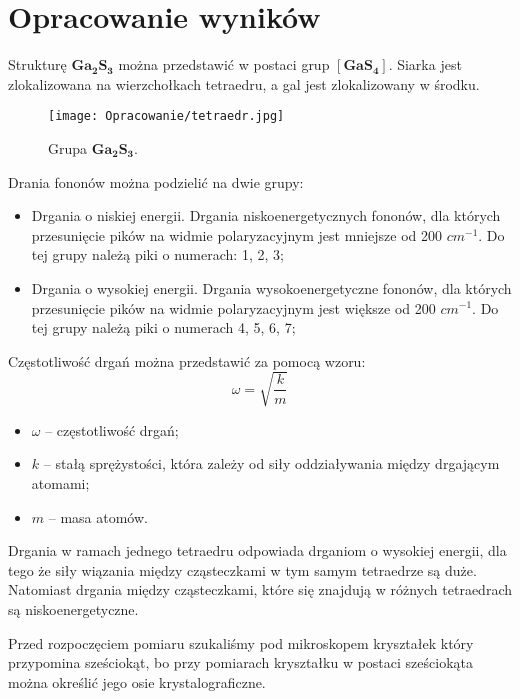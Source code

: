 \newpage

\section{Opracowanie wyników}

Strukturę $\mathbf{Ga_{2}S_{3}}$ można przedstawić w postaci grup $\mathbf{[GaS_{4}]}$. Siarka jest zlokalizowana na wierzchołkach tetraedru, a gal jest zlokalizowany w środku.

\begin{figure}[H]
	\begin{center}
		\texttt{[image: Opracowanie/tetraedr.jpg]}
		\caption{Grupa $\mathbf{Ga_{2}S_{3}}$.}
	\end{center}
\end{figure}

Drania fononów można podzielić na dwie grupy:
\begin{itemize}
	\item Drgania o niskiej energii. Drgania niskoenergetycznych fononów, dla których przesunięcie pików na widmie polaryzacyjnym jest mniejsze od 200 $cm^{-1}$. Do tej grupy należą piki o numerach: 1, 2, 3;
	\item Drgania o wysokiej energii. Drgania wysokoenergetyczne fononów, dla których przesunięcie pików na widmie polaryzacyjnym jest większe od 200 $cm^{-1}$. Do tej grupy należą piki o numerach 4, 5, 6, 7;
\end{itemize}

Częstotliwość drgań można przedstawić za pomocą wzoru:
\begin{equation}
	\omega = \sqrt{\frac{k}{m}}
\end{equation} 

\begin{itemize}
	\item $\omega$ -- częstotliwość drgań;
	\item $k$ -- stałą sprężystości, która zależy od siły oddziaływania między drgającym atomami;
	\item $m$ -- masa atomów.
\end{itemize}

Drgania w ramach jednego tetraedru odpowiada drganiom o wysokiej energii, dla tego że siły wiązania między cząsteczkami w tym samym tetraedrze są duże. Natomiast drgania między cząsteczkami, które się znajdują w różnych tetraedrach są niskoenergetyczne.

Przed rozpoczęciem pomiaru szukaliśmy pod mikroskopem kryształek który przypomina sześciokąt, bo przy pomiarach kryształku w postaci sześciokąta można określić jego osie krystalograficzne.

